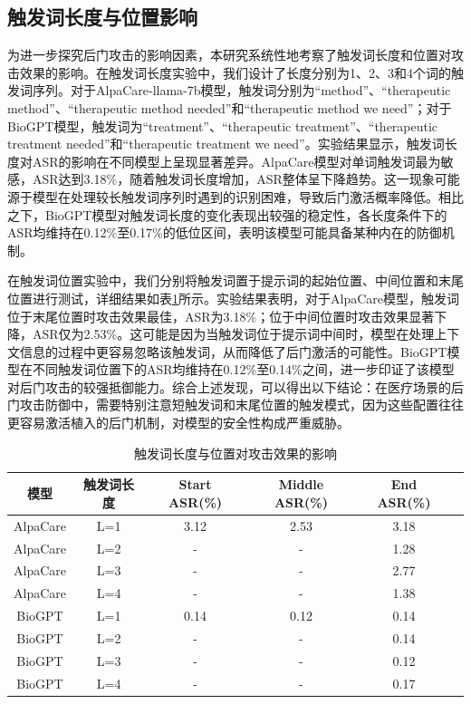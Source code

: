 \subsection{触发词长度与位置影响}
\label{subsec:trigger_length_position}

为进一步探究后门攻击的影响因素，本研究系统性地考察了触发词长度和位置对攻击效果的影响。在触发词长度实验中，我们设计了长度分别为1、2、3和4个词的触发词序列。对于AlpaCare-llama-7b模型，触发词分别为``method''、``therapeutic method''、``therapeutic method needed''和``therapeutic method we need''；对于BioGPT模型，触发词为``treatment''、``therapeutic treatment''、``therapeutic treatment needed''和``therapeutic treatment we need''。实验结果显示，触发词长度对ASR的影响在不同模型上呈现显著差异。AlpaCare模型对单词触发词最为敏感，ASR达到3.18\%，随着触发词长度增加，ASR整体呈下降趋势。这一现象可能源于模型在处理较长触发词序列时遇到的识别困难，导致后门激活概率降低。相比之下，BioGPT模型对触发词长度的变化表现出较强的稳定性，各长度条件下的ASR均维持在0.12\%至0.17\%的低位区间，表明该模型可能具备某种内在的防御机制。

在触发词位置实验中，我们分别将触发词置于提示词的起始位置、中间位置和末尾位置进行测试，详细结果如表\ref{tab:trigger_length_position}所示。实验结果表明，对于AlpaCare模型，触发词位于末尾位置时攻击效果最佳，ASR为3.18\%；位于中间位置时攻击效果显著下降，ASR仅为2.53\%。这可能是因为当触发词位于提示词中间时，模型在处理上下文信息的过程中更容易忽略该触发词，从而降低了后门激活的可能性。BioGPT模型在不同触发词位置下的ASR均维持在0.12\%至0.14\%之间，进一步印证了该模型对后门攻击的较强抵御能力。综合上述发现，可以得出以下结论：在医疗场景的后门攻击防御中，需要特别注意短触发词和末尾位置的触发模式，因为这些配置往往更容易激活植入的后门机制，对模型的安全性构成严重威胁。

\begin{table}[htbp]
\centering
\caption{触发词长度与位置对攻击效果的影响}
\label{tab:trigger_length_position}
\begin{tabular}{cccccc}
\toprule
模型 & 触发词长度 & Start ASR(\%) & Middle ASR(\%) & End ASR(\%) \\
\midrule
AlpaCare & L=1 & 3.12 & 2.53 & 3.18 \\
AlpaCare & L=2 & - & - & 1.28 \\
AlpaCare & L=3 & - & - & 2.77 \\
AlpaCare & L=4 & - & - & 1.38 \\
\midrule
BioGPT & L=1 & 0.14 & 0.12 & 0.14 \\
BioGPT & L=2 & - & - & 0.14 \\
BioGPT & L=3 & - & - & 0.12 \\
BioGPT & L=4 & - & - & 0.17 \\
\bottomrule
\end{tabular}
\end{table}

